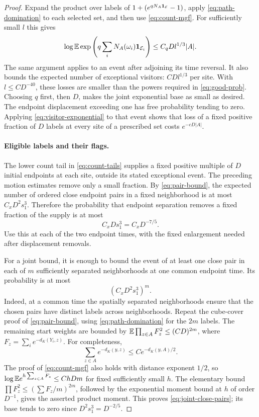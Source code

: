 \begin{proof}
Expand the product over labels of
$1+(e^{qN_A\mathbf 1_{\mathcal E}}-1)$, apply
\eqref{eq:path-domination} to each selected set, and then use
\eqref{eq:count-mgf}.  For sufficiently small $l$ this gives
\begin{equation}\label{eq:visitor-exponential}
 \log\mathbb E\exp\left(q\sum_iN_A(\omega_i)\mathbf 1_{\mathcal E_i}\right)
                    \le C_qDl^{1/3}|A|.
\end{equation}
The same argument applies to an event after adjoining its time
reversal.  It also bounds the expected number of exceptional visitors:
$CDl^{1/3}$ per site.  With $l\le CD^{-40}$, these losses are smaller
than the powers required in \eqref{eq:good-prob}.  Choosing $q$ first,
then $D$, makes the joint exponential base as small as desired.
The endpoint displacement exceeding one has free probability tending
to zero.  Applying \eqref{eq:visitor-exponential} to that event shows
that loss of a fixed positive fraction of $D$ labels at every site of
a prescribed set costs $e^{-cD|A|}$.

\paragraph{Eligible labels and their flags.}
The lower count tail in \eqref{eq:count-tails} supplies a fixed positive
multiple of $D$ initial endpoints at each site, outside its stated
exceptional event.  The preceding motion estimates remove only a
small fraction.  By \eqref{eq:pair-bound}, the expected number of
ordered close endpoint pairs in a fixed neighborhood is at most
$C_xD^2s_1^3$.  Therefore the probability that endpoint separation
removes a fixed fraction of the supply is at most
\[
                         C_xDs_1^3=C_xD^{-7/5}.
\]
Use this at each of the two endpoint times, with the fixed enlargement
needed after displacement removals.

For a joint bound, it is enough to bound the event of at least one
close pair in each of $m$ sufficiently separated neighborhoods at one common endpoint time.
Its probability is at most
\begin{equation}\label{eq:joint-close-pairs}
                            (C_xD^2s_1^3)^m.
\end{equation}
Indeed, at a common time the spatially separated neighborhoods
ensure that the chosen pairs have distinct labels across neighborhoods.  Repeat the cube-cover proof of
\eqref{eq:pair-bound}, using \eqref{eq:path-domination} for the $2m$
labels.  The remaining start weights are bounded by
$\mathbb E\prod_{z\in A}F_z^2\le(CD)^{2m}$, where
$F_z=\sum_i e^{-d_K(Y_i,z)}$.  For completeness,
\[
 \sum_{z\in A} e^{-d_K(y,z)}
                         \le Ce^{-d_K(y,A)/2}.
\]
The proof of \eqref{eq:count-mgf} also holds with distance exponent
$1/2$, so
$\log\mathbb E e^{h\sum_{z\in A}F_z}\le ChDm$ for fixed sufficiently
small $h$.  The elementary bound
$\prod F_z^2\le(\sum F_z/m)^{2m}$, followed by the exponential
moment bound at $h$ of order $D^{-1}$, gives the asserted product
moment.  This proves \eqref{eq:joint-close-pairs}; its base tends to
zero since $D^2s_1^3=D^{-2/5}$.


\end{proof}
